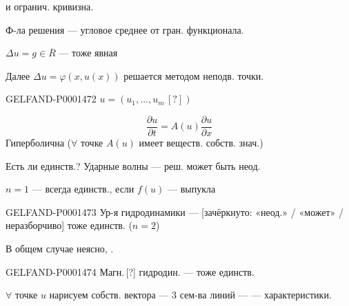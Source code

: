 и огранич. кривизна.

Ф-ла решения — угловое среднее от гран. функционала.

$\Delta u=g\in\overline R$ — тоже явная

Далее $\Delta u=\varphi(x,u(x))$ решается методом неподв. точки.


\begin{GelfandAdjacentEvidence}{GELFAND-P000147}{2}
$u=(u_1,\ldots,u_m\,[?])$
\end{GelfandAdjacentEvidence}

\begin{equation*}
\frac{\partial u}{\partial t}=A(u)\frac{\partial u}{\partial x}
\end{equation*}
Гиперболична ($\forall$ точке $A(u)$ имеет веществ. собств. знач.)

Есть ли единств.? Ударные волны — реш. может быть неод.

$n=1$ — всегда единств., если $f(u)$ — выпукла

\begin{GelfandAdjacentEvidence}{GELFAND-P000147}{3}
Ур-я гидродинамики — [зачёркнуто: «неод.» / «может» / неразборчиво] тоже единств. ($n=2$)
\end{GelfandAdjacentEvidence}

В общем случае неясно, .

\begin{GelfandAdjacentEvidence}{GELFAND-P000147}{4}
Магн.\,[?] гидродин. — тоже единств.
\end{GelfandAdjacentEvidence}

 $\forall$ точке $u$ нарисуем собств. вектора — 3 сем-ва линий — — характеристики.

